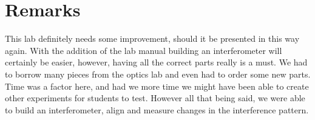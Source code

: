 \section{Remarks}

This lab definitely needs some improvement, should it be presented in this way again. With the addition of the lab manual building an interferometer will certainly be easier, however, having all the correct parts really is a must.  We had to borrow many pieces from the optics lab and even had to order some new parts. Time was a factor here, and had we more time we might have been able to create other experiments for students to test.  However all that being said, we were able to build an interferometer, align and measure changes in the interference pattern.